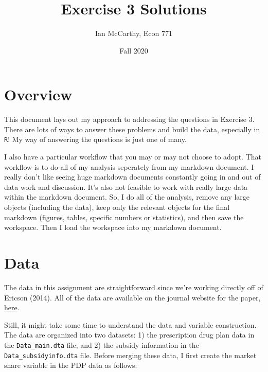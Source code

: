 \documentclass[
  12pt,
]{article}
\title{Exercise 3 Solutions}
\author{Ian McCarthy, Econ 771}
\date{Fall 2020}
\begin{document}
\maketitle


\hypertarget{overview}{%
\section{Overview}\label{overview}}

This document lays out my approach to addressing the questions in Exercise 3. There are lots of ways to answer these problems and build the data, especially in \texttt{R}! My way of answering the questions is just one of many.

I also have a particular workflow that you may or may not choose to adopt. That workflow is to do all of my analysis seperately from my markdown document. I really don't like seeing huge markdown documents constantly going in and out of data work and discussion. It's also not feasible to work with really large data within the markdown document. So, I do all of the analysis, remove any large objects (including the data), keep only the relevant objects for the final markdown (figures, tables, specific numbers or statistics), and then save the workspace. Then I load the workspace into my markdown document.

\hypertarget{data}{%
\section{Data}\label{data}}

The data in this assignment are straightforward since we're working directly off of Ericson (2014). All of the data are available on the journal website for the paper, \href{https://www.aeaweb.org/articles?id=10.1257/pol.6.1.38}{here}.

Still, it might take some time to understand the data and variable construction. The data are organized into two datasets: 1) the prescription drug plan data in the \texttt{Data\_main.dta} file; and 2) the subsidy information in the \texttt{Data\_subsidyinfo.dta} file. Before merging these data, I first create the market share variable in the PDP data as follows:

\end{document}
